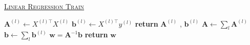 \documentclass[10pt]{article}
\begin{document}
\begin{algorithm}
	\caption{\underline{\textsc{Linear Regression Train}}}
	\label{linreg}
	\begin{algorithmic}[1] %
		 
			\State $\mathbf{A}^{(l)} \gets X^{(l){\top}} X^{(l)}$
			\State $\mathbf{b}^{(l)} \gets X^{(l){\top}} y^{(l)}$
			\State \textbf{return}  $\mathbf{A}^{(l)}$ , $\mathbf{b}^{(l)}$
		\EndProcedure
			\State $\mathbf{A} \gets \sum_l \mathbf{A}^{(l)}$
			\State $\mathbf{b} \gets \sum_l \mathbf{b}^{(l)}$
			\State $\mathbf{w} = \mathbf{A}^{-1} \mathbf{b}$
			\State \textbf{return} $\mathbf{w}$
		\EndProcedure
	\end{algorithmic}
\end{algorithm}
\end{document}
